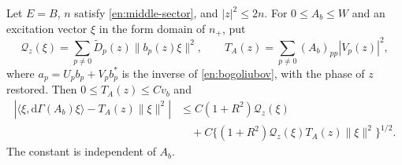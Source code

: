 \begin{lemma}\label{en:observable}
Let $E=B$, $n$ satisfy \eqref{en:middle-sector}, and $|z|^2\le2n$.
For $0\le A_b\le W$ and an excitation vector $\xi$ in the form domain
of $n_+$, put
\[
 \mathcal Q_z(\xi)=\sum_{p\ne0}\widetilde D_p(z)\|b_p(z)\xi\|^2,
 \qquad
 T_A(z)=\sum_{p\ne0}(A_b)_{pp}|V_p(z)|^2,
\]
where $a_p=U_pb_p+V_pb_p^*$ is the inverse of
\eqref{en:bogoliubov}, with the phase of $z$ restored.
Then $0\le T_A(z)\le Cv_b$ and
\begin{align}
 \left|\langle\xi,\mathrm d\Gamma(A_b)\xi\rangle
                   -T_A(z)\|\xi\|^2\right|
 &\le C(1+R^2)\mathcal Q_z(\xi)\nonumber\\
 &\quad+C\{(1+R^2)\mathcal Q_z(\xi)
                            T_A(z)\|\xi\|^2\}^{1/2}.
 \label{en:observable-bound}
\end{align}
The constant is independent of $A_b$.
\end{lemma}

